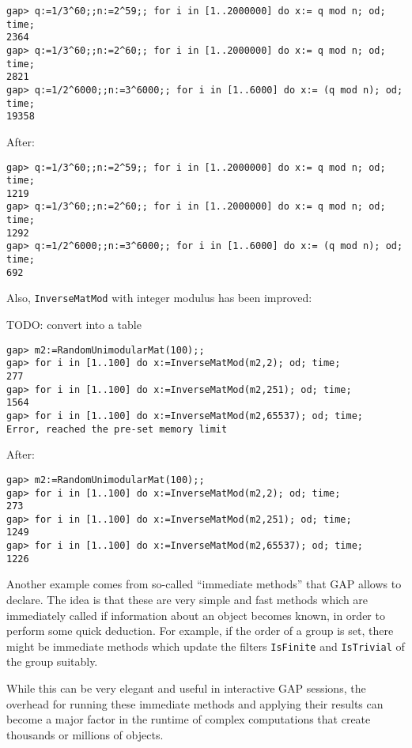 \documentclass{deliverablereport}
\begin{document}
{\small
\begin{verbatim}
gap> q:=1/3^60;;n:=2^59;; for i in [1..2000000] do x:= q mod n; od; time;
2364
gap> q:=1/3^60;;n:=2^60;; for i in [1..2000000] do x:= q mod n; od; time;
2821
gap> q:=1/2^6000;;n:=3^6000;; for i in [1..6000] do x:= (q mod n); od; time;
19358
\end{verbatim}
}

After:

{\small
\begin{verbatim}
gap> q:=1/3^60;;n:=2^59;; for i in [1..2000000] do x:= q mod n; od; time;
1219
gap> q:=1/3^60;;n:=2^60;; for i in [1..2000000] do x:= q mod n; od; time;
1292
gap> q:=1/2^6000;;n:=3^6000;; for i in [1..6000] do x:= (q mod n); od; time;
692
\end{verbatim}
}

Also, \verb|InverseMatMod| with integer modulus has been improved:%

TODO: convert into a table

{\small
\begin{verbatim}
gap> m2:=RandomUnimodularMat(100);;
gap> for i in [1..100] do x:=InverseMatMod(m2,2); od; time;
277
gap> for i in [1..100] do x:=InverseMatMod(m2,251); od; time;
1564
gap> for i in [1..100] do x:=InverseMatMod(m2,65537); od; time;
Error, reached the pre-set memory limit
\end{verbatim}
}

After:

{\small
\begin{verbatim}
gap> m2:=RandomUnimodularMat(100);;
gap> for i in [1..100] do x:=InverseMatMod(m2,2); od; time;
273
gap> for i in [1..100] do x:=InverseMatMod(m2,251); od; time;
1249
gap> for i in [1..100] do x:=InverseMatMod(m2,65537); od; time;
1226
\end{verbatim}

}

Another example comes from so-called ``immediate methods'' that
GAP allows to  declare. The idea is that these 
are very simple and fast methods which are immediately called if information 
about an object becomes known, in order to perform some quick deduction. 
For example, if the order of a group is set, there might be immediate methods 
which update the filters \verb|IsFinite| and \verb|IsTrivial| of the group suitably.

While this can be very elegant and useful in interactive GAP sessions, 
the overhead for running these immediate methods and applying their 
results can become a major factor in the runtime of complex computations 
that create thousands or millions of objects.
\end{document}

